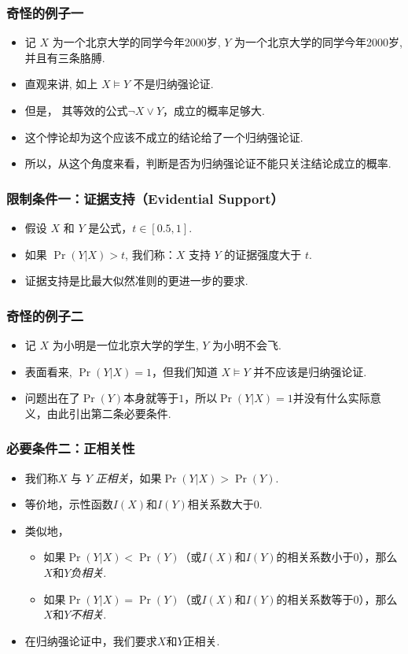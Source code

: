 \begin{frame}
	\frametitle{奇怪的例子一}
	\begin{itemize}
	\item 记 $X$ 为一个北京大学的同学今年2000岁, $Y$ 为一个北京大学的同学今年2000岁,并且有三条胳膊.
	\item 直观来讲, 如上 $X\models Y$ 不是归纳强论证.
	\item 但是， 其等效的公式$\neg X\vee Y$，成立的概率足够大.
	\item 这个悖论却为这个应该不成立的结论给了一个归纳强论证.
    \item 所以，从这个角度来看，判断是否为归纳强论证不能只关注结论成立的概率.
	\end{itemize}
\end{frame}

\begin{frame}
	\frametitle{限制条件一：证据支持（Evidential Support）}
	\begin{itemize}
        \item 假设 $X$ 和 $Y$ 是公式，$t\in [0.5, 1]$.
        \item 如果 $\Pr(Y|X)>t$, 我们称：$X$ 支持 $Y$ 的证据强度大于 $t$.
        \item 证据支持是比最大似然准则的更进一步的要求.
	\end{itemize}
\end{frame}

\begin{frame}
	\frametitle{奇怪的例子二}
	\begin{itemize}
	\item 记 $X$ 为小明是一位北京大学的学生, $Y$ 为小明不会飞.
	\item 表面看来, $\Pr(Y|X)=1$，但我们知道 $X\models Y$ 并不应该是归纳强论证.
    \item 问题出在了$\Pr(Y)$本身就等于$1$，所以$\Pr(Y|X)=1$并没有什么实际意义，由此引出第二条必要条件.
	\end{itemize}
\end{frame}

\begin{frame}
    \frametitle{必要条件二：正相关性}
    \begin{itemize}
        \item 我们称$X$ 与 $Y$ \emph{正相关}，如果$\Pr(Y|X) > \Pr(Y)$.
        \item 等价地，示性函数$I(X)$和$I(Y)$相关系数大于$0$.
        \item 类似地，
        \begin{itemize}
            \item 如果$\Pr(Y|X) < \Pr(Y)$（或$I(X)$和$I(Y)$的相关系数小于$0$），那么$X$和$Y$\emph{负相关}.
            \item 如果$\Pr(Y|X) = \Pr(Y)$（或$I(X)$和$I(Y)$的相关系数等于$0$），那么$X$和$Y$\emph{不相关}.
        \end{itemize}
    \item 在归纳强论证中，我们要求$X$和$Y$正相关.
    \end{itemize}
\end{frame}

